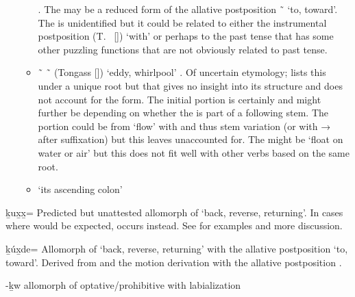 \begin{morphdesc}[resume*=alphalist]
\begin{enumerate}
\begin{itemize}
				\parencite[f04/135]{leer:1973}.
			The  may be a reduced form of the allative postposition
				 \~\  ‘to, toward’.
			The  is unidentified but it could be related to either the
				instrumental postposition  (T.\  []) ‘with’
				or perhaps to the past tense  that has some other
				puzzling functions that are not obviously related to past tense.
		\item	{} \~\  \~\ 
				(Tongass  [])
				 ‘eddy, whirlpool’
				 \parencites[04/192]{leer:1973}[19]{leer:1978b}[M·91]{leer-hitch-ritter:2001}.
			Of uncertain etymology; \textcites{leer:1973}{leer:1978b} lists this under a
				unique root 
				but that gives no insight into its structure
				and does not account for the  form.
			The initial portion is certainly 
				and might further be 
				depending on whether the  is part of a following stem.
			The  portion could be from  ‘flow’
				\parencites[05/1]{leer:1973}[313]{leer:1976}
				with  and thus  stem variation
				(or  with → after suffixation)
				but this leaves  unaccounted for.
			The  might be  ‘float on water or air’
				\parencites[03/299]{leer:1973}[235]{leer:1976}
				but this does not fit well with other verbs based on the same root.
		\item	{} ‘its ascending colon’
			\parencite[M·122]{leer-hitch-ritter:2001}
		\end{itemize}
	\end{enumerate}


\item[\llap{*}ḵux̱x̱=]\label{m:ḵux̱x̱=}
	Predicted but unattested allomorph of  ‘back, reverse, returning’.
	In cases where  would be expected,  occurs instead.
	See  for examples and more discussion.

\item[ḵúx̱de=]\label{m:ḵúx̱de=}
	Allomorph of  ‘back, reverse, returning’
		with the allative postposition  ‘to, toward’.
	Derived from  and the motion derivation
		with the allative postposition .

\item[-ḵw]\label{m:-ḵw-optphib}
	allomorph of optative/prohibitive  with labialization


\end{morphdesc}

